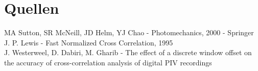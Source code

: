 \documentclass[main.tex]{subfiles}
\begin{document}
	\section{Quellen}

	MA Sutton, SR McNeill, JD Helm, YJ Chao - Photomechanics, 2000 - Springer \\
	J. P. Lewis - Fast Normalized Cross Correlation, 1995 \\
	J. Westerweel, D. Dabiri, M. Gharib - The effect of a discrete window offset on the accuracy of cross-correlation
	analysis of digital PIV recordings
\end{document}
